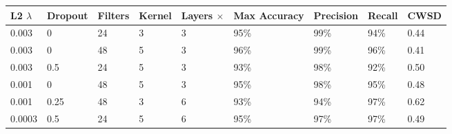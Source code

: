 \documentclass[10pt]{article}
\begin{document}
\begin{minipage}{\textwidth}
    \begin{center}
        \begin{tabular}{|l|l|l|l|l|l|l|l|l|}
            \hline
            L2 $\lambda$ & Dropout & Filters & Kernel & Layers $\times$ & Max Accuracy & Precision & Recall & CWSD \\
            \hline
            0.003 & 0 & 24 & 3 & 3 & 95\% & 99\% & 94\% & 0.44 \\
            \hline
            0.003 & 0 & 48 & 5 & 3 & 96\% & 99\% & 96\% & 0.41 \\
            \hline
            0.003 & 0.5 & 24 & 5 & 3 & 93\% & 98\% & 92\% & 0.50 \\
            \hline
            0.001 & 0 & 48 & 5 & 3 & 95\% & 98\% & 95\% & 0.48 \\
            \hline
            0.001 & 0.25 & 48 & 3 & 6 & 93\% & 94\% & 97\% & 0.62 \\
            \hline
            0.0003 & 0.5 & 24 & 5 & 6 & 95\% & 97\% & 97\% & 0.49 \\
            \hline
        \end{tabular}
    \end{center}
\end{minipage}
\end{document}
